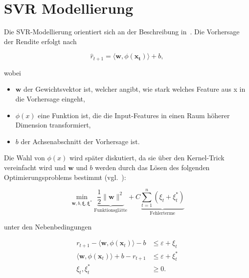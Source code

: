 \chapter{SVR Modellierung}\label{appendix:svr_modellierung}
Die \ac{SVR}-Modellierung orientiert sich an der Beschreibung in~\cite{drucker1997svr}. Die Vorhersage der Rendite erfolgt nach

\begin{equation}\label{eq:renditeSVR}
    \hat{r}_{t+1} = \langle\mathbf{w}, \phi(\mathbf{x_t})\rangle + b,
\end{equation}

wobei
\begin{itemize}
    \item $\mathbf{w}$ der Gewichtsvektor ist, welcher angibt, wie stark welches Feature aus x in die Vorhersage eingeht,
    \item $\phi(x)$ eine Funktion ist, die die Input-Features in einen Raum höherer Dimension transformiert,
    \item $b$ der Achsenabschnitt der Vorhersage ist.
\end{itemize}

Die Wahl von $\phi(x)$ wird später diskutiert, da sie über den Kernel-Trick vereinfacht wird und $\mathbf{w}$ und $b$ werden durch das Lösen des folgenden Optimierungsproblems bestimmt (vgl.~\cite{drucker1997svr}):

\begin{equation}\label{eq:optSVR}
    \min_{\mathbf{w}, b, \boldsymbol{\xi}, \boldsymbol{\xi}^*} \underbrace{\frac{1}{2}\|\mathbf{w}\|^2}_{\text{Funktionsglätte}} + C \underbrace{\sum_{t=1}^{n} (\xi_t + \xi_t^*)}_{\text{Fehlerterme}}
\end{equation}

unter den Nebenbedingungen

\begin{align}
    r_{t+1}-\langle\mathbf{w},\phi(\mathbf{x}_t)\rangle-b & \leq\varepsilon+\xi_t\label{eq:nb1}   \\
    \langle\mathbf{w},\phi(\mathbf{x}_t)\rangle+b-r_{t+1} & \leq\varepsilon+\xi_t^*\label{eq:nb2} \\
    \xi_t,\xi_t^*                                         & \geq0.\label{eq:nb3}
\end{align}

